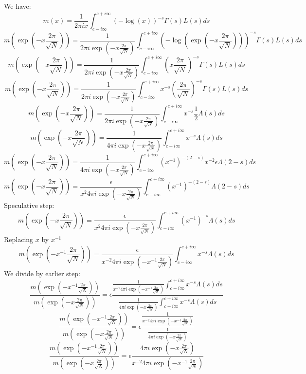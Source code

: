 \documentclass[a4paper]{amsart}
\begin{document}
We have:
$$m(x) = \frac{1}{2\pi i x} \int_{c - i\infty}^{c + i\infty}(-\log(x))^{-s} \Gamma(s)L(s)ds$$
$$m(\exp\left(-x\frac{2\pi}{\sqrt{N}}\right)) = \frac{1}{2\pi i \exp\left(-x\frac{2\pi}{\sqrt{N}}\right)} \int_{c - i\infty}^{c + i\infty}(-\log(\exp\left(-x\frac{2\pi}{\sqrt{N}}\right)))^{-s} \Gamma(s)L(s)ds$$
$$m(\exp\left(-x\frac{2\pi}{\sqrt{N}}\right)) = \frac{1}{2\pi i \exp\left(-x\frac{2\pi}{\sqrt{N}}\right)} \int_{c - i\infty}^{c + i\infty}(x\frac{2\pi}{\sqrt{N}})^{-s} \Gamma(s)L(s)ds$$
$$m(\exp\left(-x\frac{2\pi}{\sqrt{N}}\right)) = \frac{1}{2\pi i \exp\left(-x\frac{2\pi}{\sqrt{N}}\right)} \int_{c - i\infty}^{c + i\infty}x^{-s}(\frac{2\pi}{\sqrt{N}})^{-s} \Gamma(s)L(s)ds$$
$$m(\exp\left(-x\frac{2\pi}{\sqrt{N}}\right)) = \frac{1}{2\pi i \exp\left(-x\frac{2\pi}{\sqrt{N}}\right)} \int_{c - i\infty}^{c + i\infty}x^{-s}\frac{1}{2}\Lambda(s)ds$$
$$m(\exp\left(-x\frac{2\pi}{\sqrt{N}}\right)) = \frac{1}{4\pi i \exp\left(-x\frac{2\pi}{\sqrt{N}}\right)} \int_{c - i\infty}^{c + i\infty}x^{-s}\Lambda(s)ds$$
$$m(\exp\left(-x\frac{2\pi}{\sqrt{N}}\right)) = \frac{1}{4\pi i \exp\left(-x\frac{2\pi}{\sqrt{N}}\right)} \int_{c - i\infty}^{c + i\infty}(x^{-1})^{-(2 - s)} x^{-2}\epsilon\Lambda(2 - s)ds$$
$$m(\exp\left(-x\frac{2\pi}{\sqrt{N}}\right)) = \frac{\epsilon}{x^{2}4\pi i \exp\left(-x\frac{2\pi}{\sqrt{N}}\right)} \int_{c - i\infty}^{c + i\infty}(x^{-1})^{-(2 - s)}\Lambda(2 - s)ds$$
Speculative step:
$$m(\exp\left(-x\frac{2\pi}{\sqrt{N}}\right)) = \frac{\epsilon}{x^{2}4\pi i \exp\left(-x\frac{2\pi}{\sqrt{N}}\right)} \int_{c - i\infty}^{c + i\infty}(x^{-1})^{-s}\Lambda(s)ds$$
Replacing $x$ by $x^{-1}$
$$m(\exp\left(-x^{-1}\frac{2\pi}{\sqrt{N}}\right)) = \frac{\epsilon}{x^{-2}4\pi i \exp\left(-x^{-1}\frac{2\pi}{\sqrt{N}}\right)} \int_{c - i\infty}^{c + i\infty}x^{-s}\Lambda(s)ds$$
We divide by earlier step:
$$\frac{m(\exp\left(-x^{-1}\frac{2\pi}{\sqrt{N}}\right))}{m(\exp\left(-x\frac{2\pi}{\sqrt{N}}\right))} = \epsilon \frac{\frac{1}{x^{-2}4\pi i \exp\left(-x^{-1}\frac{2\pi}{\sqrt{N}}\right)} \int_{c - i\infty}^{c + i\infty}x^{-s}\Lambda(s)ds}{\frac{1}{4\pi i \exp\left(-x\frac{2\pi}{\sqrt{N}}\right)} \int_{c - i\infty}^{c + i\infty}x^{-s}\Lambda(s)ds}$$
$$\frac{m(\exp\left(-x^{-1}\frac{2\pi}{\sqrt{N}}\right))}{m(\exp\left(-x\frac{2\pi}{\sqrt{N}}\right))} = \epsilon \frac{\frac{1}{x^{-2}4\pi i \exp\left(-x^{-1}\frac{2\pi}{\sqrt{N}}\right)} }{\frac{1}{4\pi i \exp\left(-x\frac{2\pi}{\sqrt{N}}\right)}}$$
$$\frac{m(\exp\left(-x^{-1}\frac{2\pi}{\sqrt{N}}\right))}{m(\exp\left(-x\frac{2\pi}{\sqrt{N}}\right))} = \epsilon\frac{4\pi i \exp\left(-x\frac{2\pi}{\sqrt{N}}\right)}{x^{-2}4\pi i \exp\left(-x^{-1}\frac{2\pi}{\sqrt{N}}\right)}$$
\end{document}
